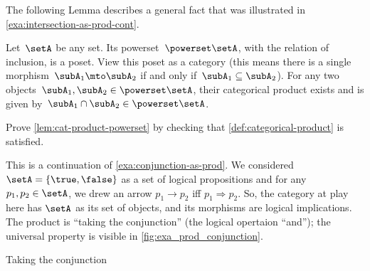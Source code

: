 The following Lemma describes a general fact that was illustrated in \cref{exa:intersection-as-prod-cont}.
\begin{lemma}
    \label{lem:cat-product-powerset}
    Let~$\setA$ be any set.
    Its powerset~$\powerset \setA$, with the relation of inclusion, is a poset.
    View this poset as a category (this means there is a single morphism~$\subA_1 \mto \subA_2$ if and only if~$\subA_1 \subseteq \subA_2$).
    For any two objects~$\subA_1, \subA_2 \in \powerset \setA$, their categorical product exists and is given by~$\subA_1 \cap \subA_2 \in \powerset \setA$.
\end{lemma}

\begin{gradedexercise}
    \label{ex:CatProductPowerset}
    Prove \cref{lem:cat-product-powerset} by checking that \cref{def:categorical-product} is satisfied.
\end{gradedexercise}


\begin{example}
    \label{exa:conjunction-as-prod-cont}
    This is a continuation of \cref{exa:conjunction-as-prod}.
    We considered $\setA = \{ \true, \false \}$ as a set of logical propositions and for any $p_1, p_2  \in \setA$, we drew an arrow $p_1 \to p_2$ iff $p_1 \Rightarrow p_2$.
    So, the category at play here has $\setA$ as its set of objects, and its morphisms are logical implications.
    The product is ``taking the conjunction'' (the logical opertaion ``and''); the universal property is visible in \cref{fig:exa_prod_conjunction}.
    \begin{marginfigure}
        \centering
        \caption{Taking the conjunction}
        \label{fig:exa_prod_conjunction_cont}
    \end{marginfigure}
\end{example}



